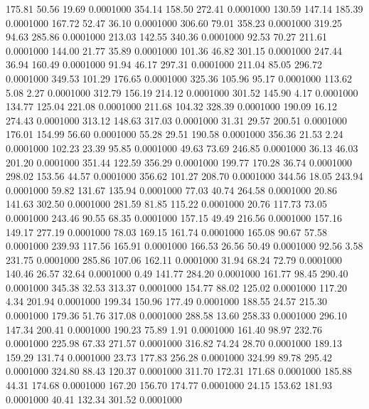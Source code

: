  175.81   50.56   19.69   0.0001000
 354.14  158.50  272.41   0.0001000
 130.59  147.14  185.39   0.0001000
 167.72   52.47   36.10   0.0001000
 306.60   79.01  358.23   0.0001000
 319.25   94.63  285.86   0.0001000
 213.03  142.55  340.36   0.0001000
  92.53   70.27  211.61   0.0001000
 144.00   21.77   35.89   0.0001000
 101.36   46.82  301.15   0.0001000
 247.44   36.94  160.49   0.0001000
  91.94   46.17  297.31   0.0001000
 211.04   85.05  296.72   0.0001000
 349.53  101.29  176.65   0.0001000
 325.36  105.96   95.17   0.0001000
 113.62    5.08    2.27   0.0001000
 312.79  156.19  214.12   0.0001000
 301.52  145.90    4.17   0.0001000
 134.77  125.04  221.08   0.0001000
 211.68  104.32  328.39   0.0001000
 190.09   16.12  274.43   0.0001000
 313.12  148.63  317.03   0.0001000
  31.31   29.57  200.51   0.0001000
 176.01  154.99   56.60   0.0001000
  55.28   29.51  190.58   0.0001000
 356.36   21.53    2.24   0.0001000
 102.23   23.39   95.85   0.0001000
  49.63   73.69  246.85   0.0001000
  36.13   46.03  201.20   0.0001000
 351.44  122.59  356.29   0.0001000
 199.77  170.28   36.74   0.0001000
 298.02  153.56   44.57   0.0001000
 356.62  101.27  208.70   0.0001000
 344.56   18.05  243.94   0.0001000
  59.82  131.67  135.94   0.0001000
  77.03   40.74  264.58   0.0001000
  20.86  141.63  302.50   0.0001000
 281.59   81.85  115.22   0.0001000
  20.76  117.73   73.05   0.0001000
 243.46   90.55   68.35   0.0001000
 157.15   49.49  216.56   0.0001000
 157.16  149.17  277.19   0.0001000
  78.03  169.15  161.74   0.0001000
 165.08   90.67   57.58   0.0001000
 239.93  117.56  165.91   0.0001000
 166.53   26.56   50.49   0.0001000
  92.56    3.58  231.75   0.0001000
 285.86  107.06  162.11   0.0001000
  31.94   68.24   72.79   0.0001000
 140.46   26.57   32.64   0.0001000
   0.49  141.77  284.20   0.0001000
 161.77   98.45  290.40   0.0001000
 345.38   32.53  313.37   0.0001000
 154.77   88.02  125.02   0.0001000
 117.20    4.34  201.94   0.0001000
 199.34  150.96  177.49   0.0001000
 188.55   24.57  215.30   0.0001000
 179.36   51.76  317.08   0.0001000
 288.58   13.60  258.33   0.0001000
 296.10  147.34  200.41   0.0001000
 190.23   75.89    1.91   0.0001000
 161.40   98.97  232.76   0.0001000
 225.98   67.33  271.57   0.0001000
 316.82   74.24   28.70   0.0001000
 189.13  159.29  131.74   0.0001000
  23.73  177.83  256.28   0.0001000
 324.99   89.78  295.42   0.0001000
 324.80   88.43  120.37   0.0001000
 311.70  172.31  171.68   0.0001000
 185.88   44.31  174.68   0.0001000
 167.20  156.70  174.77   0.0001000
  24.15  153.62  181.93   0.0001000
  40.41  132.34  301.52   0.0001000
